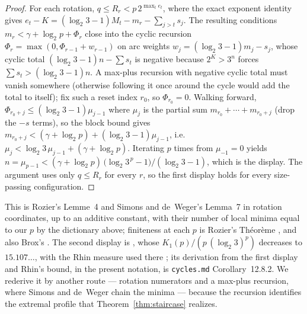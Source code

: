 \documentclass[11pt]{article}
\theoremstyle{remark}
\newcommand{\LL}{\log_2 3}
\begin{document}
\begin{proof}
For each rotation, $q \le R_r < p\,2^{\max_t e_t}$, where the exact exponent identity gives $e_t - K = (\LL-1)M_t - m_r - \sum_{j>t}s_j$. The resulting conditions $m_r < \gamma + \log_2 p + \Phi_r$ close into the cyclic recursion $\Phi_{r} = \max(0, \Phi_{r-1} + w_{r-1})$ on arc weights $w_j = (\LL-1)m_j - s_j$, whose cyclic total $(\LL-1)n - \sum s_t$ is negative because $2^K > 3^n$ forces $\sum s_t > (\LL - 1)n$. A max-plus recursion with negative cyclic total must vanish somewhere (otherwise following it once around the cycle would add the total to itself); fix such a reset index $r_0$, so $\Phi_{r_0} = 0$. Walking forward, $\Phi_{r_0+j} \le (\LL-1)\mu_{j-1}$ where $\mu_j$ is the partial sum $m_{r_0} + \cdots + m_{r_0+j}$ (drop the $-s$ terms), so the block bound gives $m_{r_0+j} < (\gamma + \log_2 p) + (\LL-1)\mu_{j-1}$, i.e.\ $\mu_j < \LL\,\mu_{j-1} + (\gamma + \log_2 p)$. Iterating $p$ times from $\mu_{-1} = 0$ yields $n = \mu_{p-1} < (\gamma + \log_2 p)\,\bigl(\LL^{\,p} - 1\bigr)/(\LL - 1)$, which is the display. The argument uses only $q \le R_r$ for every $r$, so the first display holds for every size-passing configuration.
\end{proof}

This is Rozier's Lemme~4 \cite[p.~11, with (5) on p.~10]{rozier91} and Simons and de~Weger's Lemma~7 \cite[p.~58]{sdw} in rotation coordinates, up to an additive constant, with their number of local minima equal to our $p$ by the dictionary above; finiteness at each $p$ is Rozier's Th\'eor\`eme \cite[p.~8]{rozier91}, and also Brox's \cite{brox}. The second display is \cite[Lemma~14 and Theorem~3(d)]{sdw}, whose $K_1(p)/(p\,(\LL)^p)$ decreases to $15.107\ldots$, with the Rhin measure used there \cite[Lemma~12]{sdw}; its derivation from the first display and Rhin's bound, in the present notation, is \texttt{cycles.md} Corollary~12.8.2. We rederive it by another route --- rotation numerators and a max-plus recursion, where Simons and de~Weger chain the minima --- because the recursion identifies the extremal profile that Theorem~\ref{thm:staircase} realizes.
\end{document}
